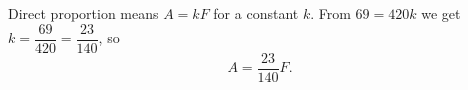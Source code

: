 Direct proportion means $A=kF$ for a constant $k$. From $69=420k$ we get $k=\dfrac{69}{420}=\dfrac{23}{140}$, so
\[\boxed{A=\dfrac{23}{140}F}.\]

